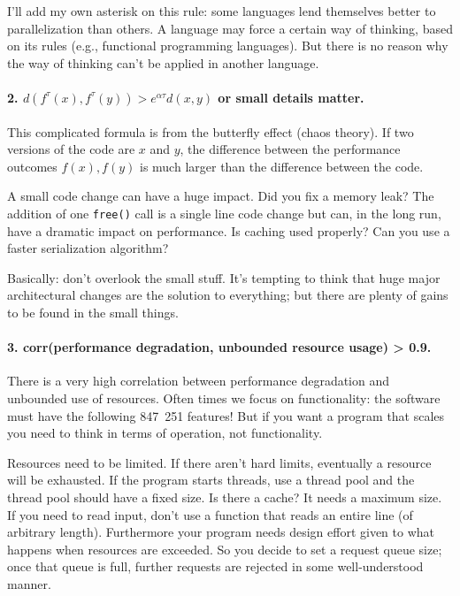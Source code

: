 \documentclass[a4paper]{report}
\begin{document}
I'll add my own asterisk on this rule: some languages lend themselves better to parallelization than others. A language may force a certain way of thinking, based on its rules (e.g., functional programming languages). But there is no reason why the way of thinking can't be applied in another language.


\paragraph{2. $d(f^{\tau}(x), f^{\tau}(y)) > e^{\alpha\tau} d(x, y)$ or small details matter.} This complicated formula is from the butterfly effect (chaos theory). If two versions of the code are $x$ and $y$, the difference between the performance outcomes $f(x), f(y)$ is much larger than the difference between the code.

A small code change can have a huge impact. Did you fix a memory leak? The addition of one \texttt{free()} call is a single line code change but can, in the long run, have a dramatic impact on performance. Is caching used properly? Can you use a faster serialization algorithm? 

Basically: don't overlook the small stuff. It's tempting to think that huge major architectural changes are the solution to everything; but there are plenty of gains to be found in the small things.

\paragraph{3. corr(performance degradation, unbounded resource usage) > 0.9.}
There is a very high correlation between performance degradation and unbounded use of resources. Often times we focus on functionality: the software must have the following 847~251 features! But if you want a program that scales you need to think in terms of operation, not functionality.

Resources need to be limited. If there aren't hard limits, eventually a resource will be exhausted. If the program starts threads, use a thread pool and the thread pool should have a fixed size. Is there a cache? It needs a maximum size. If you need to read input, don't use a function that reads an entire line (of arbitrary length). Furthermore your program needs design effort given to what happens when resources are exceeded. So you decide to set a request queue size; once that queue is full, further requests are rejected in some well-understood manner. 
\end{document}
